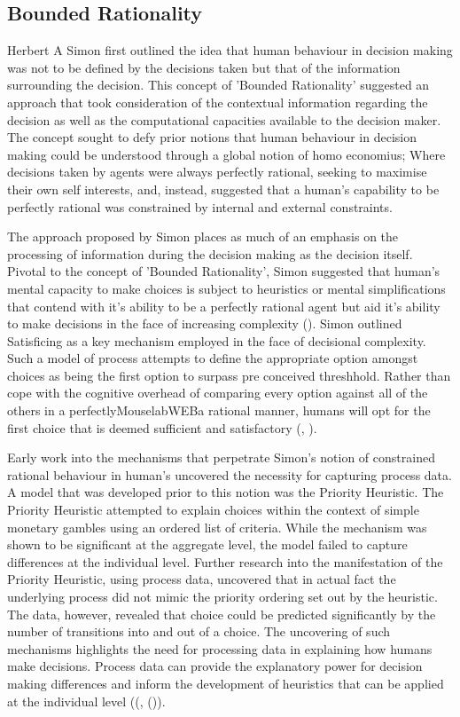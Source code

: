 \documentclass[man, floatsintext]{apa7}
\begin{document}
\subsection{Bounded Rationality}

Herbert A Simon first outlined the idea that human behaviour in decision making was not to be defined by the decisions taken but that of the information surrounding the decision. This concept of 'Bounded Rationality' suggested an approach that took consideration of the contextual information regarding the decision as well as the computational capacities available to the decision maker. The concept sought to defy prior notions that human behaviour in decision making could be understood through a global notion of homo economius; Where decisions taken by agents were always perfectly rational, seeking to maximise their own self interests, and, instead, suggested that a human's capability to be perfectly rational was constrained by internal and external constraints.

The approach proposed by Simon places as much of an emphasis on the processing of information during the decision making as the decision itself. Pivotal to the concept of 'Bounded Rationality', Simon suggested that human's mental capacity to make choices is subject to heuristics or mental simplifications that contend with it's ability to be a perfectly rational agent but aid it's ability to make decisions in the face of increasing complexity (\cite{payneTaskComplexityContingent1976}).  Simon outlined Satisficing as a key mechanism  employed in the face of decisional complexity. Such a model of process attempts to define the appropriate option amongst choices as being the first option to surpass pre conceived threshhold. Rather than cope with the cognitive overhead of comparing every option against all of the others in a perfectly{MouselabWEBa} rational manner, humans will opt for the first choice that is deemed sufficient and satisfactory (\cite{simonRationalChoiceStructure1956d}, \citeyear{simonBehavioralModelRational1955}).

Early work into the mechanisms that perpetrate Simon's notion of constrained rational behaviour in human's uncovered the necessity for capturing process data. A model that was developed prior to this notion was the Priority Heuristic. The Priority Heuristic attempted to explain choices within the context of simple monetary gambles using an ordered list of criteria. While the mechanism was shown to be significant at the aggregate level, the model failed to capture differences at the individual level. Further research into the manifestation of the Priority Heuristic, using process data, uncovered that in actual fact the underlying process did not mimic the priority ordering set out by the heuristic. The data, however, revealed that choice could be predicted significantly by the number of transitions into and out of a choice. The uncovering of such mechanisms highlights the need for processing data in explaining how humans make decisions. Process data can provide the explanatory power for decision making differences and inform the development of heuristics that can be applied at the individual level ((\cite{brandstatterPriorityHeuristicMaking2006}, (\cite{willemsenVisitingDecisionFactory2011})).
\end{document}
